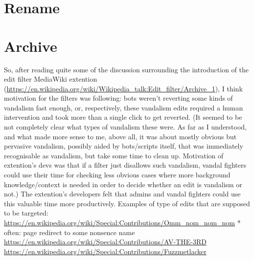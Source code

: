 \section{Rename}

\section{Archive}
So, after reading quite some of the discussion surrounding the introduction of the edit filter MediaWiki extention (\url{https://en.wikipedia.org/wiki/Wikipedia_talk:Edit_filter/Archive_1}),
I think motivation for the filters was following:
bots weren't reverting some kinds of vandalism fast enough, or, respectively, these vandalism edits required a human intervention and took more than a single click to get reverted.
(It seemed to be not completely clear what types of vandalism these were.
As far as I understood, and what made more sense to me, above all, it was about mostly obvious but pervasive vandalism, possibly aided by bots/scripts itself, that was immediately recognisable as vandalism, but take some time to clean up.
Motivation of extention's devs was that if a filter just disallows such vandalism, vandal fighters could use their time for checking less obvious cases where more background knowledge/context is needed in order to decide whether an edit is vandalism or not.)
The extention's developers felt that admins and vandal fighters could use this valuable time more productively.
Examples of type of edits that are supposed to be targeted:
\url{https://en.wikipedia.org/wiki/Special:Contributions/Omm_nom_nom_nom}
* often: page redirect to some nonsence name
\url{https://en.wikipedia.org/wiki/Special:Contributions/AV-THE-3RD}
\url{https://en.wikipedia.org/wiki/Special:Contributions/Fuzzmetlacker}



